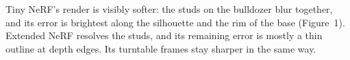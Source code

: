Tiny NeRF's render is visibly softer: the studs on the bulldozer blur together, and its error is brightest along the silhouette and the rim of the base (Figure~1). Extended NeRF resolves the studs, and its remaining error is mostly a thin outline at depth edges. Its turntable frames stay sharper in the same way.
